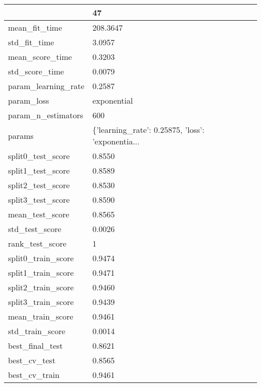 \begin{tabular}{ll}
\toprule
{} &                                                 47 \\
\midrule
mean\_fit\_time       &                                           208.3647 \\
std\_fit\_time        &                                             3.0957 \\
mean\_score\_time     &                                             0.3203 \\
std\_score\_time      &                                             0.0079 \\
param\_learning\_rate &                                             0.2587 \\
param\_loss          &                                        exponential \\
param\_n\_estimators  &                                                600 \\
params              &  \{'learning\_rate': 0.25875, 'loss': 'exponentia... \\
split0\_test\_score   &                                             0.8550 \\
split1\_test\_score   &                                             0.8589 \\
split2\_test\_score   &                                             0.8530 \\
split3\_test\_score   &                                             0.8590 \\
mean\_test\_score     &                                             0.8565 \\
std\_test\_score      &                                             0.0026 \\
rank\_test\_score     &                                                  1 \\
split0\_train\_score  &                                             0.9474 \\
split1\_train\_score  &                                             0.9471 \\
split2\_train\_score  &                                             0.9460 \\
split3\_train\_score  &                                             0.9439 \\
mean\_train\_score    &                                             0.9461 \\
std\_train\_score     &                                             0.0014 \\
best\_final\_test     &                                             0.8621 \\
best\_cv\_test        &                                             0.8565 \\
best\_cv\_train       &                                             0.9461 \\
\bottomrule
\end{tabular}
